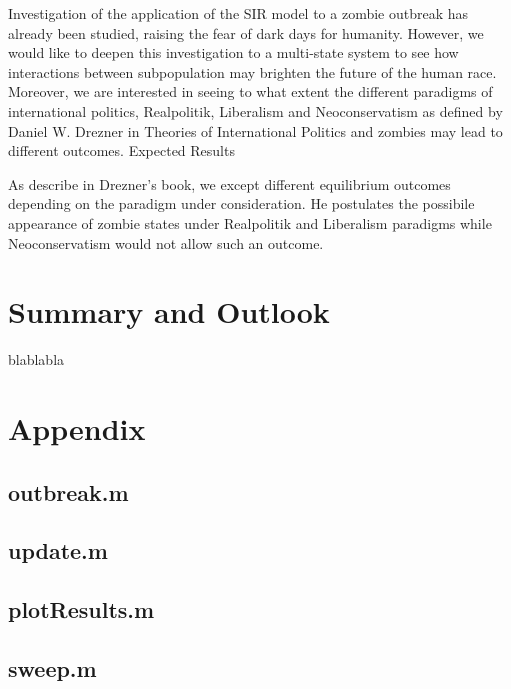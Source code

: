 \documentclass[11pt]{article}
\begin{document}
Investigation of the application of the SIR model to a zombie outbreak has already been studied, raising the fear of dark days for humanity. However, we would like to deepen this investigation to a multi-state system to see how interactions between subpopulation may brighten the future of the human race. Moreover, we are interested in seeing to what extent the different paradigms of international politics, Realpolitik, Liberalism and Neoconservatism as defined by Daniel W. Drezner in Theories of International Politics and zombies may lead to different outcomes.
Expected Results

As describe in Drezner's book, we except different equilibrium outcomes depending on the paradigm under consideration. He postulates the possibile appearance of zombie states under Realpolitik and Liberalism paradigms while Neoconservatism would not allow such an outcome.

\section{Summary and Outlook}\indent

blablabla\cite{reluga2009sis}


\nocite{bennett1995modelling, balcan2011phase, funk2010modelling, reluga2010game, reluga2009sis, munz2009zombies, drezner}

\section{Appendix}

\subsection{outbreak.m}

\bigskip
\bigskip
\bigskip

\subsection{update.m}

\bigskip
\bigskip
\bigskip

\subsection{plotResults.m}

\bigskip
\bigskip
\bigskip

\subsection{sweep.m}

\end{document}

